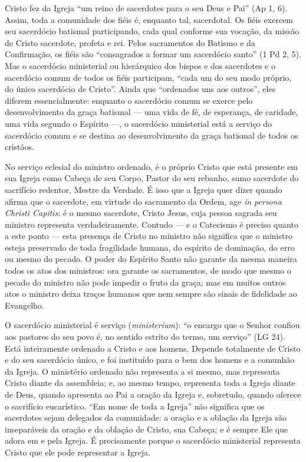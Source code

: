 Cristo fez da Igreja ``um reino de sacerdotes para o seu Deus e Pai'' (Ap 1, 6). Assim, toda a comunidade dos fiéis é, enquanto tal, sacerdotal. Os fiéis exercem seu sacerdócio batismal participando, cada qual conforme sua vocação, da missão de Cristo sacerdote, profeta e rei. Pelos sacramentos do Batismo e da Confirmação, os fiéis são ``consagrados a formar um sacerdócio santo'' (1 Pd 2, 5). Mas o sacerdócio ministerial ou hierárquico dos bispos e dos sacerdotes e o sacerdócio comum de todos os fiéis participam, ``cada um do seu modo próprio, do único sacerdócio de Cristo''. Ainda que ``ordenados uns aos outros'', eles diferem essencialmente: enquanto o sacerdócio comum se exerce pelo desenvolvimento da graça batismal --- uma vida de fé, de esperança, de caridade, uma vida segundo o Espírito ---, o sacerdócio ministerial está a serviço do sacerdócio comum e se destina ao desenvolvimento da graça batismal de todos os cristãos.

No serviço eclesial do ministro ordenado, é o próprio Cristo que está presente em sua Igreja como Cabeça de seu Corpo, Pastor do seu rebanho, sumo sacerdote do sacrifício redentor, Mestre da Verdade. É isso que a Igreja quer dizer quando afirma que o sacerdote, em virtude do sacramento da Ordem, age \textit{in persona Christi Capitis}: é o mesmo sacerdote, Cristo Jesus, cuja pessoa sagrada seu ministro representa verdadeiramente. Contudo --- e o Catecismo é preciso quanto a este ponto --- esta presença de Cristo no ministro não significa que o ministro esteja preservado de toda fragilidade humana, do espírito de dominação, do erro ou mesmo do pecado. O poder do Espírito Santo não garante da mesma maneira todos os atos dos ministros: ora garante os sacramentos, de modo que mesmo o pecado do ministro não pode impedir o fruto da graça; mas em muitos outros atos o ministro deixa traços humanos que nem sempre são sinais de fidelidade ao Evangelho.

O sacerdócio ministerial é serviço (\textit{ministerium}): ``o encargo que o Senhor confiou aos pastores do seu povo é, no sentido estrito do termo, um serviço'' (LG 24). Está inteiramente ordenado a Cristo e aos homens. Depende totalmente de Cristo e do seu sacerdócio único, e foi instituído para o bem dos homens e a comunhão da Igreja. O ministério ordenado não representa a si mesmo, mas representa Cristo diante da assembleia; e, ao mesmo tempo, representa toda a Igreja diante de Deus, quando apresenta ao Pai a oração da Igreja e, sobretudo, quando oferece o sacrifício eucarístico. ``Em nome de toda a Igreja'' não significa que os sacerdotes sejam delegados da comunidade: a oração e a oblação da Igreja são inseparáveis da oração e da oblação de Cristo, sua Cabeça; e é sempre Ele que adora em e pela Igreja. É precisamente porque o sacerdócio ministerial representa Cristo que ele pode representar a Igreja.


